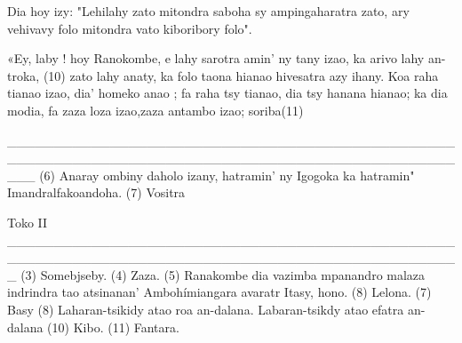 Dia hoy izy: "Lehilahy zato mitondra saboha sy ampingaharatra zato, ary vehivavy
folo mitondra vato kiboribory folo".

«Ey, laby ! hoy Ranokombe, e lahy sarotra amin' ny tany izao, ka arivo lahy an-troka, 
(10) zato lahy anaty, ka folo taona hianao hivesatra azy ihany. Koa raha tianao izao, dia' homeko anao ; 
fa raha tsy tianao, dia tsy hanana hianao; ka dia modia, fa zaza loza izao,zaza antambo izao; soriba(11)

___________________________________________________________________________________________________
(6) Anaray ombiny daholo izany, hatramin' ny Igogoka ka hatramin" Imandralfakoandoha. 
(7) Vositra

Toko II
_________________________________________________________________________________________________
(3) Somebjseby. 
(4) Zaza. 
(5) Ranakombe dia vazimba mpanandro malaza indrindra tao atsinanan' Ambohímiangara avaratr Itasy, hono. 
(8) Lelona. 
(7) Basy 
(8) Laharan-tsikidy atao roa an-dalana. Labaran-tsikdy atao efatra an-dalana 
(10) Kibo.
(11) Fantara.